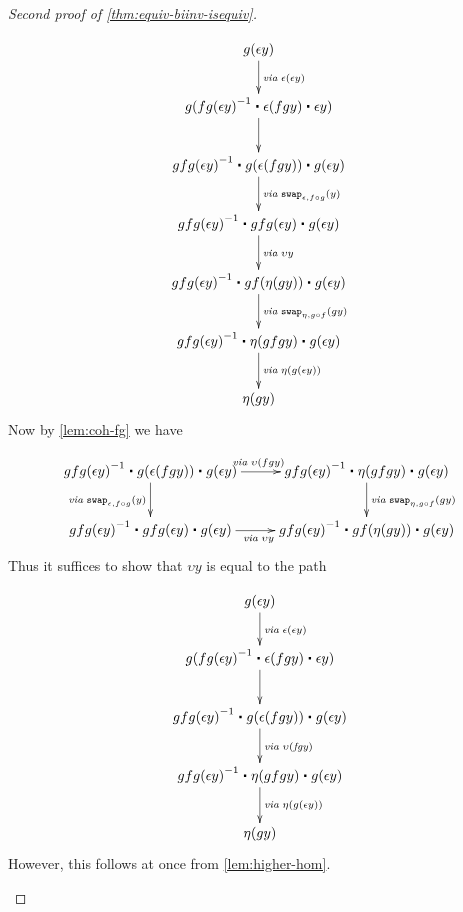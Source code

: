 \begin{proof}[Second proof of \autoref{thm:equiv-biinv-isequiv}]
\begin{enumerate}
\begin{align*}
\xymatrix{
g(\epsilon y) \ar[d]^{\mathit{via \;} \epsilon(\epsilon y)} \\
g(\opp{fg(\epsilon y)} \ct \epsilon (f g y) \ct \epsilon y) \ar[d] \\
\opp{gfg(\epsilon y)} \ct g(\epsilon (f g y)) \ct g(\epsilon y) \ar[d]^{\mathit{via \; } \com{\epsilon}{f \circ g}{y}} \\
\opp{gfg(\epsilon y)} \ct gfg (\epsilon y) \ct g(\epsilon y) \ar[d]^{\mathit{via \;} \upsilon y} \\
\opp{gfg(\epsilon y)} \ct gf(\eta (g y)) \ct g(\epsilon y) \ar[d]^{\mathit{via\;}\com{\eta}{g\circ f}{gy}} \\
\opp{gfg(\epsilon y)} \ct \eta (gfgy) \ct g(\epsilon y) \ar[d]^{\mathit{via \;} \eta(g(\epsilon y))} \\
\eta(g y)}
\end{align*}
Now by \autoref{lem:coh-fg} we have

\begin{align*}
\xymatrix{
\opp{gfg(\epsilon y)} \ct g(\epsilon (f g y)) \ct g(\epsilon y) \ar[d]_{\mathit{via \; } \com{\epsilon}{f \circ g}{y}} \ar[r]^{\mathit{via \; } \upsilon(fgy)} &
\opp{gfg(\epsilon y)} \ct \eta (gfgy) \ct g(\epsilon y) \ar[d]^{\mathit{via\;}\com{\eta}{g\circ f}{gy}} \\
\opp{gfg(\epsilon y)} \ct gfg (\epsilon y) \ct g(\epsilon y) \ar[r]_{\mathit{via \;} \upsilon y} &
\opp{gfg(\epsilon y)} \ct gf(\eta (g y)) \ct g(\epsilon y)} 
\end{align*}
Thus it suffices to show that $\upsilon y$ is equal to the path

\begin{align*}
\xymatrix{
g(\epsilon y) \ar[d]^{\mathit{via \;} \epsilon(\epsilon y)} \\
g(\opp{fg(\epsilon y)} \ct \epsilon (f g y) \ct \epsilon y) \ar[d] \\
\opp{gfg(\epsilon y)} \ct g(\epsilon (f g y)) \ct g(\epsilon y) \ar[d]^{\mathit{via \; \upsilon(fgy)}}  \\
\opp{gfg(\epsilon y)} \ct \eta (gfgy) \ct g(\epsilon y) \ar[d]^{\mathit{via \;} \eta(g(\epsilon y))} \\
\eta(g y)}
\end{align*}
However, this follows at once from \autoref{lem:higher-hom}.



\end{enumerate}
\end{proof}
